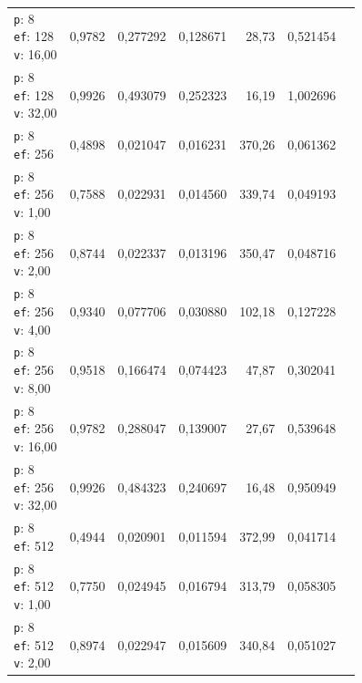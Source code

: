 \begin{table}[htbp]
\begin{tabularx}{\textwidth}{Xrrrrrr}
    \makecell{\texttt{p}: 8\\\texttt{ef}: 128\\\texttt{v}: 16,00} & 0,9782 & 0,277292 & 0,128671 & 28,73 & 0,521454 \\
    \makecell{\texttt{p}: 8\\\texttt{ef}: 128\\\texttt{v}: 32,00} & 0,9926 & 0,493079 & 0,252323 & 16,19 & 1,002696 \\
    \makecell{\texttt{p}: 8\\\texttt{ef}: 256} & 0,4898 & 0,021047 & 0,016231 & 370,26 & 0,061362 \\
    \makecell{\texttt{p}: 8\\\texttt{ef}: 256\\\texttt{v}: 1,00} & 0,7588 & 0,022931 & 0,014560 & 339,74 & 0,049193 \\
    \makecell{\texttt{p}: 8\\\texttt{ef}: 256\\\texttt{v}: 2,00} & 0,8744 & 0,022337 & 0,013196 & 350,47 & 0,048716 \\
    \makecell{\texttt{p}: 8\\\texttt{ef}: 256\\\texttt{v}: 4,00} & 0,9340 & 0,077706 & 0,030880 & 102,18 & 0,127228 \\
    \makecell{\texttt{p}: 8\\\texttt{ef}: 256\\\texttt{v}: 8,00} & 0,9518 & 0,166474 & 0,074423 & 47,87 & 0,302041 \\
    \makecell{\texttt{p}: 8\\\texttt{ef}: 256\\\texttt{v}: 16,00} & 0,9782 & 0,288047 & 0,139007 & 27,67 & 0,539648 \\
    \makecell{\texttt{p}: 8\\\texttt{ef}: 256\\\texttt{v}: 32,00} & 0,9926 & 0,484323 & 0,240697 & 16,48 & 0,950949 \\
    \makecell{\texttt{p}: 8\\\texttt{ef}: 512} & 0,4944 & 0,020901 & 0,011594 & 372,99 & 0,041714 \\
    \makecell{\texttt{p}: 8\\\texttt{ef}: 512\\\texttt{v}: 1,00} & 0,7750 & 0,024945 & 0,016794 & 313,79 & 0,058305 \\
    \makecell{\texttt{p}: 8\\\texttt{ef}: 512\\\texttt{v}: 2,00} & 0,8974 & 0,022947 & 0,015609 & 340,84 & 0,051027 \\

\end{tabularx}
\end{table}
